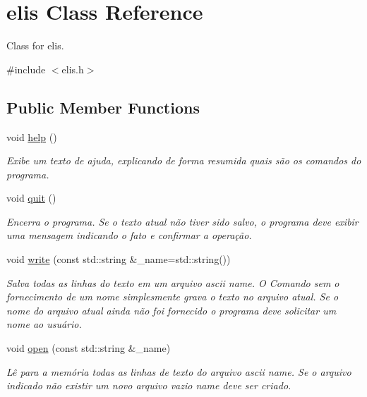 \hypertarget{classelis}{}\section{elis Class Reference}
\label{classelis}


Class for elis.  




{\ttfamily \#include $<$elis.\+h$>$}

\subsection*{Public Member Functions}
\begin{DoxyCompactItemize}
\item 
\mbox{\label{classelis_ab0982ac8d4cf72566aab79a002559831}} 
void \hyperlink{classelis_ab0982ac8d4cf72566aab79a002559831}{help} ()
\begin{DoxyCompactList}\small\item\em Exibe um texto de ajuda, explicando de forma resumida quais são os comandos do programa. \end{DoxyCompactList}\item 
\mbox{\label{classelis_a0a743df9141cb61978d1739b3654409b}} 
void \hyperlink{classelis_a0a743df9141cb61978d1739b3654409b}{quit} ()
\begin{DoxyCompactList}\small\item\em Encerra o programa. Se o texto atual não tiver sido salvo, o programa deve exibir uma mensagem indicando o fato e confirmar a operação. \end{DoxyCompactList}\item 
void \hyperlink{classelis_a92ba8d201559a28f3592ab340311e108}{write} (const std\+::string \&\+\_\+name=std\+::string())
\begin{DoxyCompactList}\small\item\em Salva todas as linhas do texto em um arquivo ascii name. O Comando sem o fornecimento de um nome simplesmente grava o texto no arquivo atual. Se o nome do arquivo atual ainda não foi fornecido o programa deve solicitar um nome ao usuário. \end{DoxyCompactList}\item 
void \hyperlink{classelis_a23ea13aa06bd599d37b2b8f7fd8a5bf9}{open} (const std\+::string \&\+\_\+name)
\begin{DoxyCompactList}\small\item\em Lê para a memória todas as linhas de texto do arquivo ascii name. Se o arquivo indicado não existir um novo arquivo vazio name deve ser criado. \end{DoxyCompactList}\item 

\end{DoxyCompactItemize}
